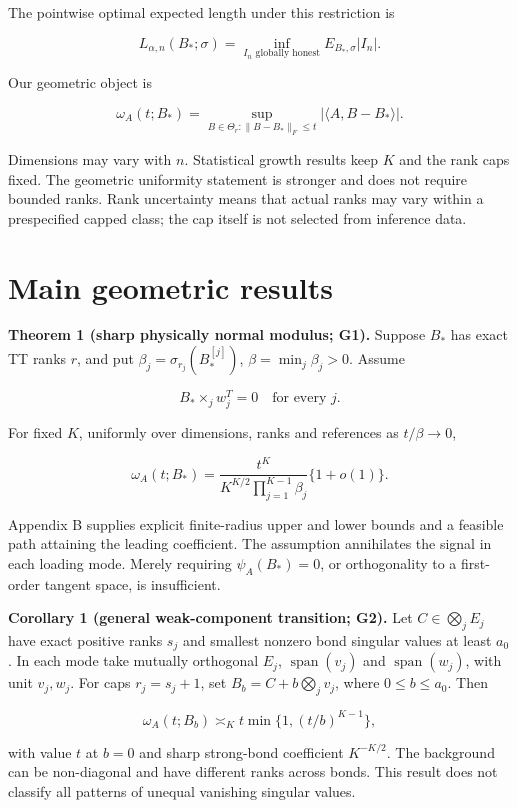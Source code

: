 \documentclass[
  11pt,
]{article}
\begin{document}
The pointwise optimal expected length under this restriction is

\[
L_{\alpha,n}(B_*;\sigma)
=\inf_{I_n\text{ globally honest}}E_{B_*,\sigma}|I_n|.
\]

Our geometric object is

\[
\omega_A(t;B_*)=
\sup_{B\in\Theta_r:\|B-B_*\|_F\le t}
|\langle A,B-B_*\rangle|.
\]

Dimensions may vary with \(n\). Statistical growth results keep \(K\)
and the rank caps fixed. The geometric uniformity statement is stronger
and does not require bounded ranks. Rank uncertainty means that actual
ranks may vary within a prespecified capped class; the cap itself is not
selected from inference data.

\section{Main geometric results}\label{main-geometric-results}

\textbf{Theorem 1 (sharp physically normal modulus; G1).} Suppose
\(B_*\) has exact TT ranks \(r\), and put
\(\beta_j=\sigma_{r_j}(B_*^{[j]})\), \(\beta=\min_j\beta_j>0\). Assume

\[
B_*\times_jw_j^T=0\quad\text{for every }j.
\]

For fixed \(K\), uniformly over dimensions, ranks and references as
\(t/\beta\to0\),

\[
\omega_A(t;B_*)=
\frac{t^K}{K^{K/2}\prod_{j=1}^{K-1}\beta_j}\{1+o(1)\}.
\]

Appendix B supplies explicit finite-radius upper and lower bounds and a
feasible path attaining the leading coefficient. The assumption
annihilates the signal in each loading mode. Merely requiring
\(\psi_A(B_*)=0\), or orthogonality to a first-order tangent space, is
insufficient.

\textbf{Corollary 1 (general weak-component transition; G2).} Let
\(C\in\bigotimes_jE_j\) have exact positive ranks \(s_j\) and smallest
nonzero bond singular values at least \(a_0\). In each mode take
mutually orthogonal \(E_j\), \(\operatorname{span}(v_j)\) and
\(\operatorname{span}(w_j)\), with unit \(v_j,w_j\). For caps
\(r_j=s_j+1\), set \(B_b=C+b\bigotimes_jv_j\), where \(0\le b\le a_0\).
Then

\[
\omega_A(t;B_b)\asymp_K
t\min\{1,(t/b)^{K-1}\},
\]

with value \(t\) at \(b=0\) and sharp strong-bond coefficient
\(K^{-K/2}\). The background can be non-diagonal and have different
ranks across bonds. This result does not classify all patterns of
unequal vanishing singular values.
\end{document}
